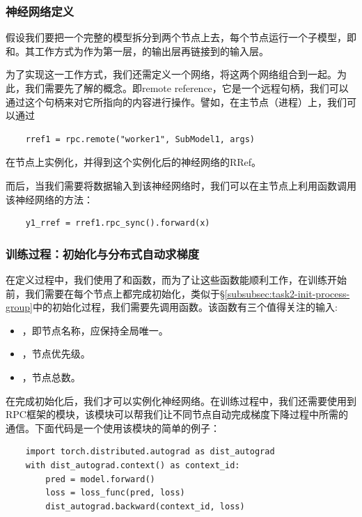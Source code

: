 \subsubsection{神经网络定义}

假设我们要把一个完整的模型拆分到两个节点上去，每个节点运行一个子模型，即和。其工作方式为作为第一层，的输出层再链接到的输入层。

为了实现这一工作方式，我们还需定义一个网络，将这两个网络组合到一起。为此，我们需要先了解的概念。即remote reference，它是一个远程句柄，我们可以通过这个句柄来对它所指向的内容进行操作。譬如，在主节点（进程）上，我们可以通过
\begin{lstlisting}
    rref1 = rpc.remote("worker1", SubModel1, args)
\end{lstlisting}
在节点上实例化，并得到这个实例化后的神经网络的RRef。

而后，当我们需要将数据输入到该神经网络时，我们可以在主节点上利用函数调用该神经网络的方法：
\begin{lstlisting}
    y1_rref = rref1.rpc_sync().forward(x)
\end{lstlisting}

\subsubsection{训练过程：初始化与分布式自动求梯度}

在定义过程中，我们使用了和函数，而为了让这些函数能顺利工作，在训练开始前，我们需要在每个节点上都完成初始化，类似于\S\ref{subsubsec:task2-init-process-group}中的初始化过程，我们需要先调用函数。该函数有三个值得关注的输入:
\begin{itemize}
    \item {}，即节点名称，应保持全局唯一。
    \item {}，节点优先级。
    \item {}，节点总数。
\end{itemize}

在完成初始化后，我们才可以实例化神经网络。在训练过程中，我们还需要使用到RPC框架的模块，该模块可以帮我们让不同节点自动完成梯度下降过程中所需的通信。下面代码是一个使用该模块的简单的例子：
\begin{lstlisting}
    import torch.distributed.autograd as dist_autograd
    with dist_autograd.context() as context_id:
        pred = model.forward()
        loss = loss_func(pred, loss)
        dist_autograd.backward(context_id, loss)
\end{lstlisting}

